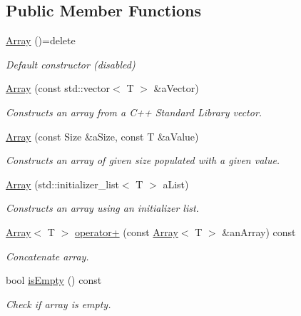\subsection*{Public Member Functions}
\begin{DoxyCompactItemize}
\item 
\hyperlink{classlibrary_1_1core_1_1ctnr_1_1Array_a95de936b24bfdf0a5d24ef45df892ecf}{Array} ()=delete
\begin{DoxyCompactList}\small\item\em Default constructor (disabled) \end{DoxyCompactList}\item 
\hyperlink{classlibrary_1_1core_1_1ctnr_1_1Array_a9b510b4e2a3f9d4a324dfd0feba01285}{Array} (const std\+::vector$<$ T $>$ \&a\+Vector)
\begin{DoxyCompactList}\small\item\em Constructs an array from a C++ Standard Library vector. \end{DoxyCompactList}\item 
\hyperlink{classlibrary_1_1core_1_1ctnr_1_1Array_a647190cec3e259a8d8ad173c18bf3020}{Array} (const Size \&a\+Size, const T \&a\+Value)
\begin{DoxyCompactList}\small\item\em Constructs an array of given size populated with a given value. \end{DoxyCompactList}\item 
\hyperlink{classlibrary_1_1core_1_1ctnr_1_1Array_adcda1d4d28575b580a978406107febbb}{Array} (std\+::initializer\+\_\+list$<$ T $>$ a\+List)
\begin{DoxyCompactList}\small\item\em Constructs an array using an initializer list. \end{DoxyCompactList}\item 
\hyperlink{classlibrary_1_1core_1_1ctnr_1_1Array}{Array}$<$ T $>$ \hyperlink{classlibrary_1_1core_1_1ctnr_1_1Array_a5d65732e2a07b268d9def2da3c955002}{operator+} (const \hyperlink{classlibrary_1_1core_1_1ctnr_1_1Array}{Array}$<$ T $>$ \&an\+Array) const
\begin{DoxyCompactList}\small\item\em Concatenate array. \end{DoxyCompactList}\item 
bool \hyperlink{classlibrary_1_1core_1_1ctnr_1_1Array_a77d943be46a6d0313be3f2c5ca66d231}{is\+Empty} () const
\begin{DoxyCompactList}\small\item\em Check if array is empty. \end{DoxyCompactList}\item 

\end{DoxyCompactItemize}

